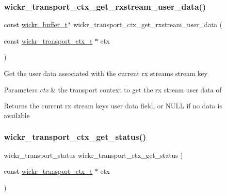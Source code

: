 \subsubsection{\texorpdfstring{wickr\+\_\+transport\+\_\+ctx\+\_\+get\+\_\+rxstream\+\_\+user\+\_\+data()}{wickr\_transport\_ctx\_get\_rxstream\_user\_data()}}
{\footnotesize\ttfamily const \hyperlink{structwickr__buffer}{wickr\+\_\+buffer\+\_\+t}$\ast$ wickr\+\_\+transport\+\_\+ctx\+\_\+get\+\_\+rxstream\+\_\+user\+\_\+data (\begin{DoxyParamCaption}\item[{const \hyperlink{structwickr__transport__ctx}{wickr\+\_\+transport\+\_\+ctx\+\_\+t} $\ast$}]{ctx }\end{DoxyParamCaption})}

Get the user data associated with the current rx stream\textquotesingle{}s stream key


\begin{DoxyParams}{Parameters}
{\em ctx} & the transport context to get the rx stream user data of \\
\hline
\end{DoxyParams}
\begin{DoxyReturn}{Returns}
the current rx stream key\textquotesingle{}s user data field, or N\+U\+LL if no data is available 
\end{DoxyReturn}
\mbox{\label{group__wickr__transport__ctx_ga3d3ffde9ec2f9f12ecb6999a048e2437}} 
\subsubsection{\texorpdfstring{wickr\+\_\+transport\+\_\+ctx\+\_\+get\+\_\+status()}{wickr\_transport\_ctx\_get\_status()}}
{\footnotesize\ttfamily wickr\+\_\+transport\+\_\+status wickr\+\_\+transport\+\_\+ctx\+\_\+get\+\_\+status (\begin{DoxyParamCaption}\item[{const \hyperlink{structwickr__transport__ctx}{wickr\+\_\+transport\+\_\+ctx\+\_\+t} $\ast$}]{ctx }\end{DoxyParamCaption})}

